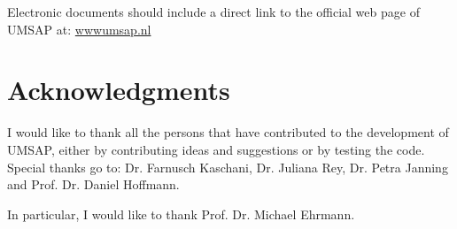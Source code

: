 \newpage

Electronic documents should include a direct link to the official web page of
UMSAP at: \href{https://www.umsap.nl}{wwwumsap.nl}

\section{Acknowledgments}

I would like to thank all the persons that have contributed to the development
of UMSAP, either by contributing ideas and suggestions or by testing the code.
Special thanks go to: Dr. Farnusch Kaschani, Dr. Juliana Rey, Dr. Petra Janning
and Prof. Dr. Daniel Hoffmann.

In particular, I would like to thank Prof. Dr. Michael Ehrmann.

